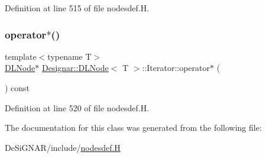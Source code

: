 Definition at line 515 of file nodesdef.\+H.

\mbox{\label{class_designar_1_1_d_l_node_1_1_iterator_ae75896ae631f91daaaa9a193df27a239}} 
\subsubsection{\texorpdfstring{operator$\ast$()}{operator*()}\hspace{0.1cm}{\footnotesize\ttfamily [2/2]}}
{\footnotesize\ttfamily template$<$typename T$>$ \\
\hyperlink{class_designar_1_1_d_l_node}{D\+L\+Node}$\ast$ \hyperlink{class_designar_1_1_d_l_node}{Designar\+::\+D\+L\+Node}$<$ T $>$\+::Iterator\+::operator$\ast$ (\begin{DoxyParamCaption}{ }\end{DoxyParamCaption}) const\hspace{0.3cm}{\ttfamily [inline]}}



Definition at line 520 of file nodesdef.\+H.



The documentation for this class was generated from the following file\+:\begin{DoxyCompactItemize}
\item 
De\+Si\+G\+N\+A\+R/include/\hyperlink{nodesdef_8_h}{nodesdef.\+H}\end{DoxyCompactItemize}
